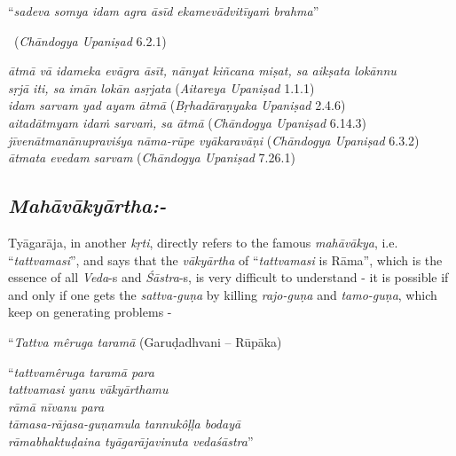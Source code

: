 \begin{myquote}
“\textit{sadeva somya idam agra āsīd ekamevādvitīyaṁ brahma}” 

~\hfill (\textit{Chāndogya Upaniṣad} 6.2.1)
\end{myquote}

\begin{myquote}
\textit{ātmā vā idameka evāgra āsīt, nānyat kiñcana miṣat, sa aikṣata lokānnu}\\ \textit{sṛjā iti, sa imān lokān asṛjata} (\textit{Aitareya Upaniṣad} 1.1.1)\\ \textit{idam sarvam yad ayam ātmā} (\textit{Bṛhadāraṇyaka Upaniṣad} 2.4.6)\\ \textit{aitadātmyam idaṁ sarvaṁ, sa ātmā} (\textit{Chāndogya Upaniṣad} 6.14.3)\\ \textit{jīvenātmanānupraviśya nāma-rūpe vyākaravāṇi} (\textit{Chāndogya Upaniṣad} 6.3.2)\\ \textit{ātmata evedam sarvam} (\textit{Chāndogya Upaniṣad} 7.26.1)
\end{myquote}


\vspace{-.3cm}

\subsection*{\textit{Mahāvākyārtha:-}}

Tyāgarāja, in another \textit{kṛti}, directly refers to the famous \textit{mahāvākya}, i.e. “\textit{tattvamasi}”, and says that the \textit{vākyārtha} of “\textit{tattvamasi} is Rāma”, which is the essence of all \textit{Veda}-s and \textit{Śāstra}-s, is very difficult to understand - it is possible if and only if one gets the \textit{sattva-guṇa} by killing \textit{rajo-guṇa} and \textit{tamo-guṇa}, which keep on generating problems -

“\textit{Tattva mêruga taramā} (Garuḍadhvani – Rūpāka)

\begin{centerquote}
“\textit{tattvamêruga taramā para}\\ \textit{tattvamasi yanu vākyārthamu}\\ \textit{rāmā nīvanu para}\\ \textit{tāmasa-rājasa-guṇamula tannukôḷḷa bodayā}\\ \textit{rāmabhaktuḍaina tyāgarājavinuta vedaśāstra}”
\end{centerquote}

